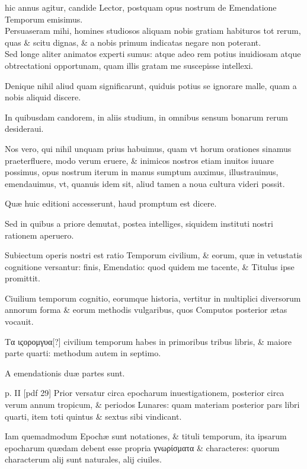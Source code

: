 \setcounter{parcount}{0}
\begin{parnumbers}
 hic annus agitur, candide
Lector, postquam opus nostrum de
Emendatione Temporum emisimus.
\\ \p
Persuaseram
mihi, homines studiosos aliquam nobis
gratiam habituros tot rerum, quas \& scitu
dignas, \& a nobis primum indicatas negare
non poterant.
\\ \p
Sed longe aliter animatos experti
sumus: atque adeo rem potius inuidiosam
atque obtrectationi opportunam, quam illis gratam me suscepisse
intellexi.

Denique nihil aliud quam significarunt, quiduis potius
se ignorare malle, quam a nobis aliquid discere.

In quibusdam
candorem, in aliis studium, in omnibus sensum bonarum rerum desideraui.

Nos vero, qui nihil unquam prius habuimus, quam vt horum
orationes sinamus praeterfluere, modo verum eruere, \& inimicos
nostros etiam inuitos iuuare possimus, opus nostrum iterum in
manus sumptum auximus, illustrauimus, emendauimus, vt, quanuis
idem sit, aliud tamen a noua cultura videri possit.

Quæ huic editioni
accesserunt, haud promptum est dicere.

Sed in quibus a priore demutat,
postea intelliges, siquidem instituti nostri rationem aperuero.

Subiectum operis nostri est ratio Temporum civilium, \& eorum,
quæ in vetustatis cognitione versantur: finis, Emendatio: quod quidem
me tacente, \& Titulus ipse promittit.

Ciuilium temporum cognitio,
eorumque historia, vertitur in multiplici diversorum annorum
forma \& eorum methodis vulgaribus, quos Computos posterior
ætas vocauit.

\textgreek{Τα ιςορομγυα[?]} civilium temporum habes in primoribus
tribus libris, \& maiore parte quarti: methodum autem in septimo.

A emendationis duæ partes sunt.

\clearpage
p. II [pdf 29]
Prior versatur circa epocharum
inuestigationem, posterior circa verum annum tropicum, 
\& periodos Lunares: quam materiam posterior pars libri quarti,
item toti quintus \& sextus sibi vindicant.

Iam quemadmodum Epochæ
sunt notationes, \& tituli temporum, ita ipsarum epocharum
quædam debent esse propria \textgreek{γνωρίσματα} \& characteres: quorum
characterum alij sunt naturales, alij ciuiles. 


\end{parnumbers}
